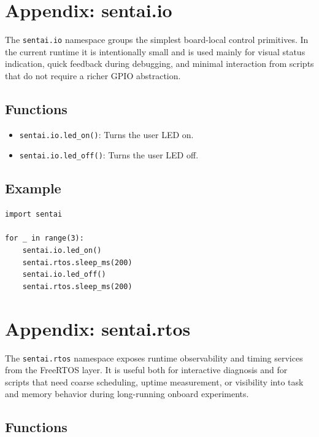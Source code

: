 \section{Appendix: sentai.io}\label{appendix-sentai.io}

The \texttt{sentai.io} namespace groups the simplest board-local control
primitives. In the current runtime it is intentionally small and is used
mainly for visual status indication, quick feedback during debugging,
and minimal interaction from scripts that do not require a richer GPIO
abstraction.

\subsection{Functions}\label{functions}

\begin{itemize}
\tightlist
\item
  \texttt{sentai.io.led\_on()}: Turns the user LED on.
\item
  \texttt{sentai.io.led\_off()}: Turns the user LED off.
\end{itemize}

\subsection{Example}\label{example}

\begin{verbatim}
import sentai

for _ in range(3):
    sentai.io.led_on()
    sentai.rtos.sleep_ms(200)
    sentai.io.led_off()
    sentai.rtos.sleep_ms(200)
\end{verbatim}

\section{Appendix: sentai.rtos}\label{appendix-sentai.rtos}

The \texttt{sentai.rtos} namespace exposes runtime observability and
timing services from the FreeRTOS layer. It is useful both for
interactive diagnosis and for scripts that need coarse scheduling,
uptime measurement, or visibility into task and memory behavior during
long-running onboard experiments.

\subsection{Functions}\label{functions-1}

